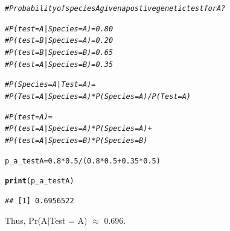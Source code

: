\documentclass[12pt]{article}\usepackage[]{graphicx}\usepackage[]{color}
\makeatletter
\newcommand{\hlnum}[1]{\textcolor[rgb]{0.686,0.059,0.569}{#1}}%
\newcommand{\hlcom}[1]{\textcolor[rgb]{0.678,0.584,0.686}{\textit{#1}}}%
\newcommand{\hlopt}[1]{\textcolor[rgb]{0,0,0}{#1}}%
\newcommand{\hlstd}[1]{\textcolor[rgb]{0.345,0.345,0.345}{#1}}%
\newcommand{\hlkwb}[1]{\textcolor[rgb]{0.69,0.353,0.396}{#1}}%
\newcommand{\hlkwd}[1]{\textcolor[rgb]{0.737,0.353,0.396}{\textbf{#1}}}%
\newenvironment{kframe}{%
 \def\at@end@of@kframe{}%
 \ifinner\ifhmode%
  \def\at@end@of@kframe{\end{minipage}}%
  \begin{minipage}{\columnwidth}%
 \fi\fi%
 \def\FrameCommand##1{\hskip\@totalleftmargin \hskip-\fboxsep
 \colorbox{shadecolor}{##1}\hskip-\fboxsep
     \hskip-\linewidth \hskip-\@totalleftmargin \hskip\columnwidth}%
 \MakeFramed {\advance\hsize-\width
   \@totalleftmargin\z@ \linewidth\hsize
   \@setminipage}}%
 {\par\unskip\endMakeFramed%
 \at@end@of@kframe}
\newenvironment{knitrout}{}{} %
\makeatother
\begin{document}
\begin{knitrout}
\color{fgcolor}\begin{kframe}
\begin{alltt}
\hlcom{# Probability of species A given a postive genetic test for A?}

\hlcom{# P(test = A | Species = A) = 0.80}
\hlcom{# P(test = B | Species = A) = 0.20}
\hlcom{# P(test = B | Species = B) = 0.65}
\hlcom{# P(test = A | Species = B) = 0.35}

\hlcom{# P(Species = A | Test = A) =}
\hlcom{#   P(Test = A | Species = A) * P(Species = A) / P(Test = A)}

\hlcom{#P(test = A) = }
\hlcom{#   P(test = A | Species = A) * P(Species = A) + }
\hlcom{#   P(test = A | Species = B) * P(Species = B)}

\hlstd{p_a_testA} \hlkwb{=} \hlnum{0.8} \hlopt{*} \hlnum{0.5} \hlopt{/} \hlstd{(}\hlnum{0.8}\hlopt{*}\hlnum{0.5}\hlopt{+}\hlnum{0.35}\hlopt{*}\hlnum{0.5}\hlstd{)}

\hlkwd{print}\hlstd{(p_a_testA)}
\end{alltt}
\begin{verbatim}
## [1] 0.6956522
\end{verbatim}
\end{kframe}
\end{knitrout}

Thus, Pr(A$\vert$Test = A) $\approx$ 0.696.
\end{document}
